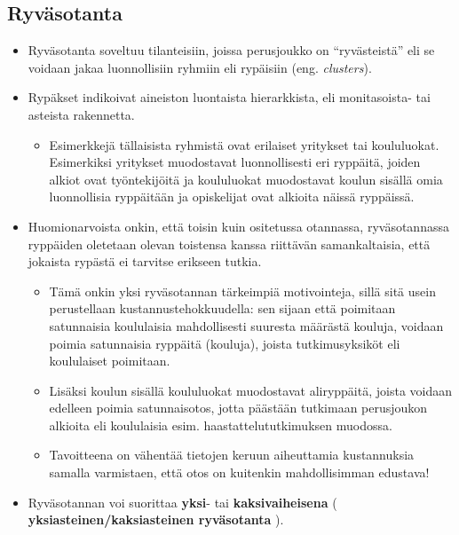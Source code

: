 \documentclass[
]{book}
\providecommand{\tightlist}{%
  \setlength{\itemsep}{0pt}\setlength{\parskip}{0pt}}
\begin{document}
\hypertarget{ryvuxe4sotanta}{%
\subsection{Ryväsotanta}\label{ryvuxe4sotanta}}

\begin{itemize}
\item
  Ryväsotanta soveltuu tilanteisiin, joissa perusjoukko on ``ryvästeistä'' eli se voidaan jakaa luonnollisiin ryhmiin eli rypäisiin (eng. \emph{clusters}).
\item
  Rypäkset indikoivat aineiston luontaista hierarkkista, eli monitasoista- tai asteista rakennetta.

  \begin{itemize}
  \tightlist
  \item
    Esimerkkejä tällaisista ryhmistä ovat erilaiset yritykset tai koululuokat. Esimerkiksi yritykset muodostavat luonnollisesti eri ryppäitä, joiden alkiot ovat työntekijöitä ja koululuokat muodostavat koulun sisällä omia luonnollisia ryppäitään ja opiskelijat ovat alkioita näissä ryppäissä.
  \end{itemize}
\item
  Huomionarvoista onkin, että toisin kuin ositetussa otannassa, ryväsotannassa ryppäiden oletetaan olevan toistensa kanssa riittävän samankaltaisia, että jokaista rypästä ei tarvitse erikseen tutkia.

  \begin{itemize}
  \tightlist
  \item
    Tämä onkin yksi ryväsotannan tärkeimpiä motivointeja, sillä sitä usein perustellaan kustannustehokkuudella: sen sijaan että poimitaan satunnaisia koululaisia mahdollisesti suuresta määrästä kouluja, voidaan poimia satunnaisia ryppäitä (kouluja), joista tutkimusyksiköt eli koululaiset poimitaan.
  \item
    Lisäksi koulun sisällä koululuokat muodostavat aliryppäitä, joista voidaan edelleen poimia satunnaisotos, jotta päästään tutkimaan perusjoukon alkioita eli koululaisia esim. haastattelututkimuksen muodossa.
  \item
    Tavoitteena on vähentää tietojen keruun aiheuttamia kustannuksia samalla varmistaen, että otos on kuitenkin mahdollisimman edustava!
  \end{itemize}
\item
  Ryväsotannan voi suorittaa \textbf{yksi}- tai \textbf{kaksivaiheisena} ( \textbf{yksiasteinen/kaksiasteinen ryväsotanta} ).


\end{itemize}
\end{document}
